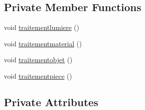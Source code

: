 \subsection*{Private Member Functions}
\begin{DoxyCompactItemize}
\item 
void \hyperlink{class_mondock_aea9fc6ea30f9958ac3a747552ecbed17}{traitementlumiere} ()
\item 
void \hyperlink{class_mondock_ab482a04624f22351da70e316fe9c8d4e}{traitementmaterial} ()
\item 
void \hyperlink{class_mondock_aad20b3c5334d00fe5e69ac5872f76f4b}{traitementobjet} ()
\item 
void \hyperlink{class_mondock_a8f0d8c5f390853f482b38bbcf943447a}{traitementpiece} ()
\end{DoxyCompactItemize}
\subsection*{Private Attributes}
